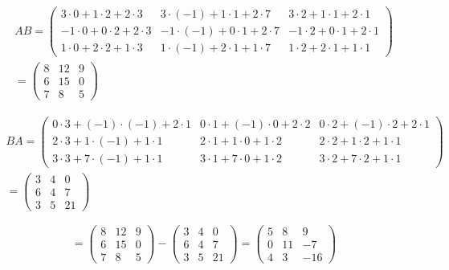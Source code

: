 \documentclass[12pt, a4paper]{article}
\begin{document}
    \begin{multline}
        AB = \left(\begin{matrix}
            3\cdot0+1\cdot2+2\cdot3 & 3\cdot\left(-1\right)+1\cdot1+2\cdot7 & 3\cdot2+1\cdot1+2\cdot1 \\
            -1\cdot0+0\cdot2+2\cdot3 & -1\cdot\left(-1\right)+0\cdot1+2\cdot7 & -1\cdot2+0\cdot1+2\cdot1 \\
            1\cdot0+2\cdot2+1\cdot3 & 1\cdot\left(-1\right)+2\cdot1+1\cdot7 & 1\cdot2+2\cdot1+1\cdot1
            \end{matrix}\right) \\ = \left(\begin{matrix}
                8 & 12 & 9 \\
                6 & 15 & 0 \\
                7 & 8 & 5
                \end{matrix}\right)
    \end{multline}

    \begin{multline}
        BA = \left(\begin{matrix}
            0\cdot3+\left(-1\right)\cdot\left(-1\right)+2\cdot1 & 0\cdot1+\left(-1\right)\cdot0+2\cdot2 & 0\cdot2+\left(-1\right)\cdot2+2\cdot1 \\
            2\cdot3+1\cdot\left(-1\right)+1\cdot1 & 2\cdot1+1\cdot0+1\cdot2 & 2\cdot2+1\cdot2+1\cdot1 \\
            3\cdot3+7\cdot\left(-1\right)+1\cdot1 & 3\cdot1+7\cdot0+1\cdot2 & 3\cdot2+7\cdot2+1\cdot1
            \end{matrix}\right) \\ = \left(\begin{matrix}
                3 & 4 & 0 \\
                6 & 4 & 7 \\
                3 & 5 & 21
                \end{matrix}\right)
    \end{multline}

    \begin{equation}
        [A, B] = \left(\begin{matrix}
            8 & 12 & 9 \\
            6 & 15 & 0 \\
            7 & 8 & 5
            \end{matrix}\right)
         - \left(\begin{matrix}
                3 & 4 & 0 \\
                6 & 4 & 7 \\
                3 & 5 & 21
            \end{matrix}\right) = \left(\begin{matrix}
                5 & 8 & 9 \\
                0 & 11 & -7 \\
                4 & 3 & -16
                \end{matrix}\right)
    \end{equation}
\end{document}
